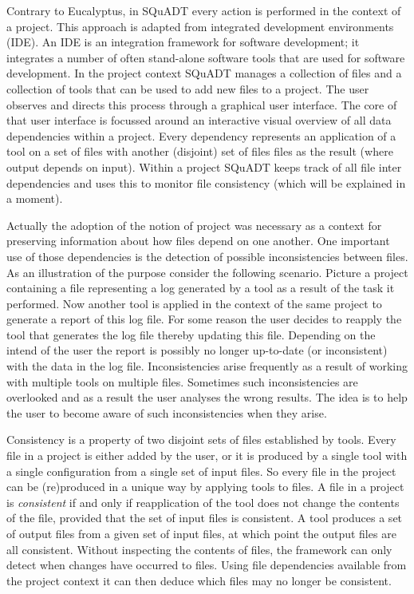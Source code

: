 \documentclass{article}
\newcommand{\squadt}{SQuADT\xspace}
\begin{document}
  
  Contrary to Eucalyptus, in \squadt every action is performed in the context
  of a project. This approach is adapted from integrated development
  environments (IDE).  An IDE is an integration framework for software
  development; it integrates a number of often stand-alone software tools that
  are used for software development. In the project context \squadt manages a
  collection of files and a collection of tools that can be used to add new
  files to a project. The user observes and directs this process through a
  graphical user interface.  The core of that user interface is focussed around
  an interactive visual overview of all data dependencies within a project.
  Every dependency represents an application of a tool on a set of files with
  another (disjoint) set of files files as the result (where output depends on
  input).  Within a project \squadt keeps track of all file inter dependencies
  and uses this to monitor file consistency (which will be explained in a moment).

  Actually the adoption of the notion of project was necessary as a context for
  preserving information about how files depend on one another. One important
  use of those dependencies is the detection of possible inconsistencies
  between files. As an illustration of the purpose consider the following
  scenario. Picture a project containing a file representing a log generated by
  a tool as a result of the task it performed. Now another tool is applied in
  the context of the same project to generate a report of this log file. For
  some reason the user decides to reapply the tool that generates the log file
  thereby updating this file.  Depending on the intend of the user the report
  is possibly no longer up-to-date (or inconsistent) with the data in the log
  file. Inconsistencies arise frequently as a result of working with multiple
  tools on multiple files. Sometimes such inconsistencies are overlooked and as
  a result the user analyses the wrong results. The idea is to help the user
  to become aware of such inconsistencies when they arise.

  Consistency is a property of two disjoint sets of files established by tools.
  Every file in a project is either added by the user, or it is produced by a
  single tool with a single configuration from a single set of input files. So
  every file in the project can be (re)produced in a unique way by applying
  tools to files. A file in a project is \textit{consistent} if and only if
  reapplication of the tool does not change the contents of the file, provided
  that the set of input files is consistent.  A tool produces a set of output
  files from a given set of input files, at which point the output files are
  all consistent. Without inspecting the contents of files, the framework can
  only detect when changes have occurred to files.  Using file dependencies
  available from the project context it can then deduce which files may no
  longer be consistent.
  
\end{document}
